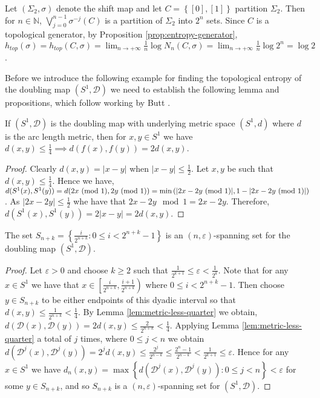 \begin{exmp} \label{exmp:shift-entropy}
    Let $(\Sigma_2, \sigma)$ denote the shift map and let $C = \left\lbrace [0], [1] \right\rbrace$ partition $\Sigma_2$. Then for $n \in \mathbb{N}$, $\bigvee_{j = 0}^{n - 1}\sigma^{-j}(C)$ is a partition of $\Sigma_2$ into $2^n$ sets. Since $C$ is a topological generator, by Proposition \ref{prop:entropy-generator}, $h_{top}(\sigma) = h_{top}(C, \sigma) = \lim_{n \to +\infty}\frac{1}{n} \log N_n(C, \sigma) = \lim_{n \to +\infty}\frac{1}{n} \log 2^n = \log 2$.
\end{exmp}

Before we introduce the following example for finding the topological entropy of the doubling map $(S^1, \mathcal{D})$ we need to establish the following lemma and propositions, which follow working by Butt \cite{butt}.

\begin{lem} \label{lem:metric-less-quarter}
    If $(S^1, \mathcal{D})$ is the doubling map with underlying metric space $(S^1, d)$ where $d$ is the arc length metric, then for $x, y \in S^1$ we have $d(x, y) \leq \frac{1}{4} \implies d(f(x), f(y)) = 2d(x, y)$.
    \begin{proof}
        Clearly $d(x, y) = |x - y|$ when $|x - y| \leq \frac{1}{2}$. Let $x, y$ be such that $d(x, y) \leq \frac{1}{4}$. Hence we have, $d(S^1(x), S^1(y)) = d(2x \ (\mathrm{mod}\ 1), 2y \ (\mathrm{mod}\ 1)) = \min{(|2x - 2y \ (\mathrm{mod}\ 1)|, 1 - |2x - 2y \ (\mathrm{mod}\ 1)|)}$. As $|2x - 2y| \leq \frac{1}{2}$ whe have that $2x - 2y \mod 1 = 2x - 2y$. Therefore, $d(S^1(x), S^1(y)) = 2|x-y| = 2d(x, y)$.
    \end{proof}
\end{lem}

\begin{prop} \label{prop:spanning-set}
    The set $S_{n+k} = \left\lbrace \frac{i}{2^{n+k}} : 0 \leq i < 2^{n+k} - 1 \right\rbrace$ is an $(n, \varepsilon)$-spanning set for the doubling map $(S^1, \mathcal{D})$. 
    \begin{proof}
        Let $\varepsilon > 0$ and choose $k \geq 2$ such that $\frac{1}{2^{k+1}} \leq \varepsilon < \frac{1}{2^k}$. Note that for any $x \in S^1$ we have that $x \in \left[\frac{i}{2^{n+k}}, \frac{i + 1}{2^{n+k}}\right)$ where $0 \leq i < 2^{n+k} - 1$. Then choose $y \in S_{n+k}$ to be either endpoints of this dyadic interval so that $d(x, y) \leq \frac{1}{2^{n+k}} < \frac{1}{4}$. By Lemma \ref{lem:metric-less-quarter} we obtain, $d(\mathcal{D}(x), \mathcal{D}(y)) = 2d(x, y) \leq \frac{2}{2^{n+k}} < \frac{1}{4}$. Applying Lemma \ref{lem:metric-less-quarter} a total of $j$ times, where $0 \leq j < n$ we obtain $d(\mathcal{D}^j(x), \mathcal{D}^j(y)) = 2^jd(x, y) \leq \frac{2^j}{2^{n - k}} \leq \frac{2^n - 1}{2^{n - k}} < \frac{1}{2^{k + 1}} \leq \varepsilon$. Hence for any $x \in S^1$ we have $d_n(x, y) = \max{\left\lbrace d(\mathcal{D}^j(x), \mathcal{D}^j(y)) : 0 \leq j < n \right\rbrace} < \varepsilon$ for some $y \in S_{n + k}$, and so $S_{n+k}$ is a $(n, \varepsilon)$-spanning set for $(S^1, \mathcal{D})$.
    \end{proof}
\end{prop}

